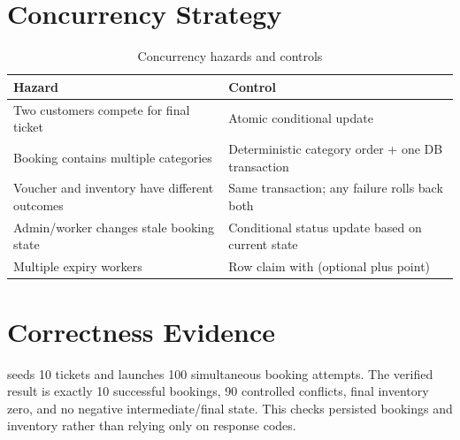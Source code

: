 \section{Concurrency Strategy}
\begin{table}[H]
\centering
\caption{Concurrency hazards and controls}
\begin{tabularx}{\textwidth}{p{}Y}
\toprule
\textbf{Hazard} & \textbf{Control} \\
\midrule
Two customers compete for final ticket & Atomic conditional update \\
Booking contains multiple categories & Deterministic category order + one DB transaction \\
Voucher and inventory have different outcomes & Same transaction; any failure rolls back both \\
Admin/worker changes stale booking state & Conditional status update based on current state \\
Multiple expiry workers & Row claim with  (optional plus point) \\
\bottomrule
\end{tabularx}
\end{table}

\section{Correctness Evidence}
 seeds 10 tickets and launches 100 simultaneous booking
attempts. The verified result is exactly 10 successful bookings, 90 controlled
conflicts, final inventory zero, and no negative intermediate/final state. This
checks persisted bookings and inventory rather than relying only on response
codes.
